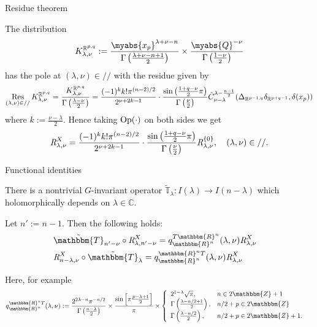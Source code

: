\documentclass[pdf]{beamer}
\newcommand{\assign}{:=}
\newcommand{\Op}{\mbox{\normalfont Op}}
\newcommand{\Res}{\operatorname{Res}\displaylimits}
\newcommand{\OpR}{\mbox{\it R}}
\theoremstyle{mystyle}
\theoremstyle{remark}
\begin{document}
\begin{frame}{Residue theorem}
	\begin{theorem}
		The distribution
		\[K_{\lambda,\nu}^{\mathbb{R}^{p,q}}:=\frac{\myabs{x_p}^{\lambda+\nu-n}}{\Gamma\left( \frac{\lambda+\nu-n+1}{2} \right)}\times
		\frac{\myabs{Q}^{-\nu}}{\Gamma\left( \frac{1-\nu}{2} \right)}\]
		has the pole at $(\lambda,\nu)\in//$ with the residue given by
		\[\Res_{(\lambda,\nu)\in//}K_{\lambda,\nu}^{\mathbb{R}^{p,q}}=\frac{K_{\lambda,\nu}^{\mathbb{R}^{p,q}}}{\Gamma\left( \frac{\lambda-\nu}{2} \right)}
			=\frac{ (- 1)^k k!\pi^{(n - 2) / 2} 
		}{2^{ \nu + 2 k-1}}\cdot  \frac{\sin\left( \frac{1+q-\nu}{2}\pi \right)}{\Gamma\left( \frac{\nu}{2} \right)}
	\tilde{C}_{\nu - \lambda}^{\lambda - \frac{n
  	- 1}{2}} ({\Delta}_{\mathbb{R}^{p-1,q}} {\delta}_{\mathbb{R}^{p+q-1}}, \delta (x_p))
		\]
		where $k:=\frac{\nu-\lambda}{2}$.
		Hence taking $\Op(\cdot)$ on both sides we get
  \[\OpR_{\lambda,\nu}^X  = \frac{ (- 1)^k k!\pi^{(n - 2) / 2} 
		}{2^{ \nu + 2 k-1}}\cdot  \frac{\sin\left( \frac{1+q-\nu}{2}\pi \right)}{\Gamma\left( \frac{\nu}{2} \right)}
     \OpR_{\lambda,\nu}^{ \left\{ 0 \right\} },\quad(\lambda,\nu)\in// . \]
	\end{theorem}
\end{frame}
\begin{frame}{Functional identities}
	\begin{fact}
		There is a nontrivial $G$-invariant operator $\tilde{\mathbb{T}}_{\lambda}:I(\lambda)\to I(n-\lambda)$ which holomorphically depends on $\lambda\in \mathbb{C}$.
	\end{fact}
	\begin{theorem}
		Let $n':=n-1$. Then the following holds:
\begin{eqnarray}
	& \tilde{\mathbbm{T}}_{n' - \nu} \circ \OpR^X_{\lambda,n'-\nu}= q^{T\mathbbm{R}^n}_{\mathbbm{R}^n} (\lambda,
  \nu) \OpR^X_{\lambda,\nu} &  \nonumber\\
  & \OpR^X_{n-\lambda,\nu} \circ
  \tilde{\mathbbm{T}}_{\lambda} = q^{\mathbbm{R}^n T}_{\mathbbm{R}^n}
  (\lambda, \nu) \OpR^X_{\lambda,\nu} & \nonumber
\end{eqnarray}

\pause
Here, for example
\begin{eqnarray}
  & q^{\mathbbm{R}^n T}_{\mathbbm{R}^n} (\lambda, \nu) \assign \frac{2^{2
  \lambda - n} \pi^{- n / 2}}{\Gamma \left( \frac{n - \lambda}{2} \right)}
  \times \frac{\sin \left[ \pi \frac{p - \lambda + 1}{2} \right]}{\pi} \times
  \left\{ \begin{array}{ll}
    2^{1 - \lambda} \sqrt{\pi}, & n \in 2\mathbbm{Z}+ 1\\
    \Gamma \left( \frac{\lambda - n / 2 + 1}{2} \right), & n / 2 + p \in
    2\mathbbm{Z}\\
    \Gamma \left( \frac{\lambda - n / 2}{2} \right), & n / 2 + p \in
    2\mathbbm{Z}+ 1.
  \end{array} \right. &  \nonumber
\end{eqnarray}
	\end{theorem}
\end{frame}
\end{document}
